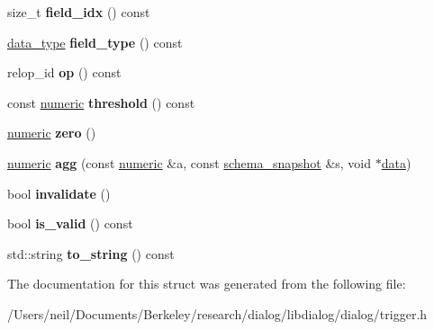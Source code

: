 \begin{DoxyCompactItemize}
\item 
\mbox{\label{structdialog_1_1monitor_1_1trigger_a2ccad4bdc03513f13d42c8d482623413}} 
size\+\_\+t {\bfseries field\+\_\+idx} () const
\item 
\mbox{\label{structdialog_1_1monitor_1_1trigger_ac52419ecb79710fc202f22bc42124a95}} 
\hyperlink{structdialog_1_1data__type}{data\+\_\+type} {\bfseries field\+\_\+type} () const
\item 
\mbox{\label{structdialog_1_1monitor_1_1trigger_a97a5f720df3e16c46ceff3280f51b01a}} 
relop\+\_\+id {\bfseries op} () const
\item 
\mbox{\label{structdialog_1_1monitor_1_1trigger_a38017ca053a1af74d51f01608c732c10}} 
const \hyperlink{classdialog_1_1numeric}{numeric} {\bfseries threshold} () const
\item 
\mbox{\label{structdialog_1_1monitor_1_1trigger_a564af6d26c3978da551e16ad575e5285}} 
\hyperlink{classdialog_1_1numeric}{numeric} {\bfseries zero} ()
\item 
\mbox{\label{structdialog_1_1monitor_1_1trigger_aeaae61bd2b90a7a2d6f31d7fbbda3068}} 
\hyperlink{classdialog_1_1numeric}{numeric} {\bfseries agg} (const \hyperlink{classdialog_1_1numeric}{numeric} \&a, const \hyperlink{classdialog_1_1schema__snapshot}{schema\+\_\+snapshot} \&s, void $\ast$\hyperlink{structdialog_1_1data}{data})
\item 
\mbox{\label{structdialog_1_1monitor_1_1trigger_a8606df378f5bf9577b37eddc123fb2c0}} 
bool {\bfseries invalidate} ()
\item 
\mbox{\label{structdialog_1_1monitor_1_1trigger_a31b40cce5b755efed5a0fa8d0fedfcbc}} 
bool {\bfseries is\+\_\+valid} () const
\item 
\mbox{\label{structdialog_1_1monitor_1_1trigger_a632d24dac88cb3885bb5f5972db29c42}} 
std\+::string {\bfseries to\+\_\+string} () const
\end{DoxyCompactItemize}


The documentation for this struct was generated from the following file\+:\begin{DoxyCompactItemize}
\item 
/\+Users/neil/\+Documents/\+Berkeley/research/dialog/libdialog/dialog/trigger.\+h\end{DoxyCompactItemize}
